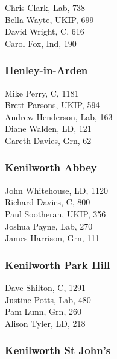 \documentclass[a4paper,openany,10pt]{book}
\begin{document}


Chris Clark, Lab, 738\\
Bella Wayte, UKIP, 699\\
David Wright, C, 616\\
Carol Fox, Ind, 190\\


\subsubsection*{Henley-in-Arden}



Mike Perry, C, 1181\\
Brett Parsons, UKIP, 594\\
Andrew Henderson, Lab, 163\\
Diane Walden, LD, 121\\
Gareth Davies, Grn, 62\\


\subsubsection*{Kenilworth Abbey}



John Whitehouse, LD, 1120\\
Richard Davies, C, 800\\
Paul Sootheran, UKIP, 356\\
Joshua Payne, Lab, 270\\
James Harrison, Grn, 111\\


\subsubsection*{Kenilworth Park Hill}



Dave Shilton, C, 1291\\
Justine Potts, Lab, 480\\
Pam Lunn, Grn, 260\\
Alison Tyler, LD, 218\\


\subsubsection*{Kenilworth St John's}
\end{document}
